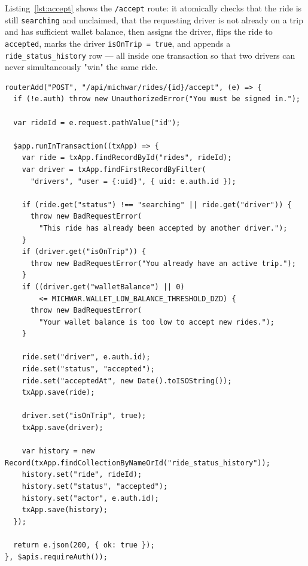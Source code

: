 \documentclass[11pt,a4paper]{article}
\begin{document}
Listing~\ref{lst:accept} shows the \texttt{/accept} route: it atomically
checks that the ride is still \texttt{searching} and unclaimed, that the
requesting driver is not already on a trip and has sufficient wallet
balance, then assigns the driver, flips the ride to \texttt{accepted}, marks
the driver \texttt{isOnTrip = true}, and appends a
\texttt{ride\_status\_history} row --- all inside one transaction so that two
drivers can never simultaneously "win" the same ride.

\begin{lstlisting}[language=JSPB,caption={\texttt{pb\_hooks/12\_rides.pb.js} --- \texttt{POST /api/michwar/rides/:id/accept} (race-safe ride acceptance).},label={lst:accept}]
routerAdd("POST", "/api/michwar/rides/{id}/accept", (e) => {
  if (!e.auth) throw new UnauthorizedError("You must be signed in.");

  var rideId = e.request.pathValue("id");

  $app.runInTransaction((txApp) => {
    var ride = txApp.findRecordById("rides", rideId);
    var driver = txApp.findFirstRecordByFilter(
      "drivers", "user = {:uid}", { uid: e.auth.id });

    if (ride.get("status") !== "searching" || ride.get("driver")) {
      throw new BadRequestError(
        "This ride has already been accepted by another driver.");
    }
    if (driver.get("isOnTrip")) {
      throw new BadRequestError("You already have an active trip.");
    }
    if ((driver.get("walletBalance") || 0)
        <= MICHWAR.WALLET_LOW_BALANCE_THRESHOLD_DZD) {
      throw new BadRequestError(
        "Your wallet balance is too low to accept new rides.");
    }

    ride.set("driver", e.auth.id);
    ride.set("status", "accepted");
    ride.set("acceptedAt", new Date().toISOString());
    txApp.save(ride);

    driver.set("isOnTrip", true);
    txApp.save(driver);

    var history = new Record(txApp.findCollectionByNameOrId("ride_status_history"));
    history.set("ride", rideId);
    history.set("status", "accepted");
    history.set("actor", e.auth.id);
    txApp.save(history);
  });

  return e.json(200, { ok: true });
}, $apis.requireAuth());
\end{lstlisting}
\end{document}

